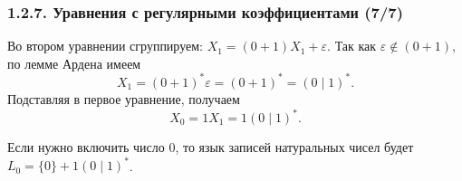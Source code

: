 \begin{frame}
\frametitle{1.2.7. Уравнения с регулярными коэффициентами (7/7)}

Во втором уравнении сгруппируем:
$X_1=(0+1)X_1+\varepsilon$.
Так как $\varepsilon\notin (0+1)$, по лемме Ардена имеем
\[
X_1=(0+1)^*\varepsilon=(0+1)^*=(0\mid 1)^*.
\]
Подставляя в первое уравнение, получаем
\[
X_0=1X_1=1(0\mid 1)^*.
\]


\begin{remark}
Если нужно включить число $0$, то язык записей натуральных чисел будет
$L_0=\{0\}+1(0\mid 1)^*$.
\end{remark}

\bigskip
{}

\end{frame}



